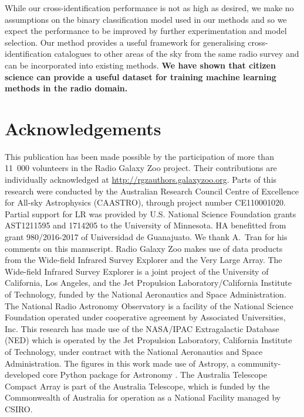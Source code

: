 \documentclass[fleqn,usenatbib,usedcolumn]{mnras}
\newcommand{\edited}[1]{{\bf {#1}}}
\begin{document}
  While our cross-identification performance is not as high as desired, we
  make no assumptions on the binary classification model used in our methods
  and so we expect the performance to be improved by further experimentation
  and model selection. Our method provides a useful framework for generalising
  cross-identification catalogues to other areas of the sky from the same
  radio survey and can be incorporated into existing methods. \edited{We have
  shown that citizen science can provide a useful dataset for training machine
  learning methods in the radio domain.}

\section{Acknowledgements}

  This publication has been made possible by the participation of more than
  11~000 volunteers in the Radio Galaxy Zoo project. Their contributions are
  individually acknowledged at \url{http://rgzauthors.galaxyzoo.org}. Parts of
  this research were conducted by the Australian Research Council Centre of
  Excellence for All-sky Astrophysics (CAASTRO), through project number
  CE110001020. Partial support for LR was provided by U.S. National Science
  Foundation grants AST1211595 and 1714205 to the University of Minnesota. HA
  benefitted from grant 980/2016-2017 of Universidad de Guanajuato. We thank
  A.~Tran for his comments on this manuscript. Radio Galaxy Zoo makes use of
  data products from the Wide-field Infrared Survey Explorer and the Very
  Large Array. The Wide-field Infrared Survey Explorer is a joint project of
  the University of California, Los Angeles, and the Jet Propulsion
  Laboratory/California Institute of Technology, funded by the National
  Aeronautics and Space Administration. The National Radio Astronomy
  Observatory is a facility of the National Science Foundation operated under
  cooperative agreement by Associated Universities, Inc. This research has
  made use of the NASA/IPAC Extragalactic Database (NED) which is operated by
  the Jet Propulsion Laboratory, California Institute of Technology, under
  contract with the National Aeronautics and Space Administration. The figures
  in this work made use of Astropy, a community-developed core Python package
  for Astronomy \citep{astropy}. The Australia Telescope Compact Array is part
  of the Australia Telescope, which is funded by the Commonwealth of Australia
  for operation as a National Facility managed by CSIRO.
\end{document}
